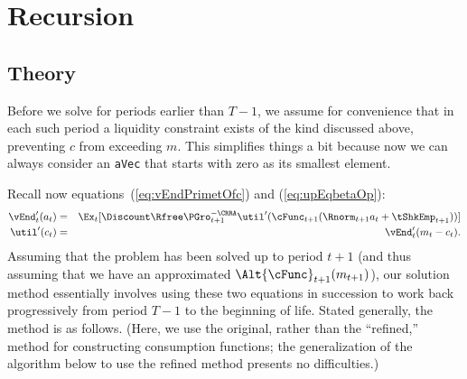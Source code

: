 \documentclass[titlepage]{\econtex}
\begin{document}
\hypertarget{Recursions}{}
\section{Recursion}\label{sec:recursion}
\hypertarget{Theory}{}
\subsection{Theory}
Before we solve for periods earlier than $T-1$, we assume for
convenience that in each such period a liquidity constraint exists of
the kind discussed above, preventing ${c}$ from exceeding ${m}$. This
simplifies things a bit because now we can always consider an
\texttt{aVec} that starts with zero as its smallest element.

Recall now equations~(\ref{eq:vEndPrimetOfc}) and (\ref{eq:upEqbetaOp}):
\begin{eqnarray*}
\vEnd_{t}^{\prime}({a}_{t}) & = & \Ex_{t}[\Discount \Rfree \PGro_{t+1}^{-\CRRA}
\util^{\prime}(\cFunc_{t+1}(\Rnorm_{t+1} {a}_{t}+{\tShkEmp}_{t+1}))]
\\\util^{\prime}({c}_{t})  & = & \vEnd_{t}^{\prime}({m}_{t}-{c}_{t}).
\end{eqnarray*}
Assuming that the problem has been solved up to period $t+1$ (and thus
assuming that we have an approximated $\Alt{\cFunc}_{t+1}({m}_{t+1})$), our solution method essentially
involves using these two equations in succession to work back
progressively from period $T-1$ to the beginning of life.  Stated
generally, the method is as follows.  (Here, we use the original, rather than the ``refined,'' method for 
constructing consumption functions; the generalization of the algorithm below to use the refined method presents
no difficulties.)
\end{document}
